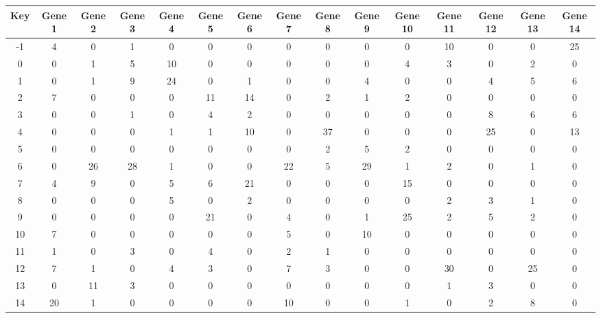 \begin{tabular}{|c|c|c|c|c|c|c|c|c|c|c|c|c|c|c|}
\hline
Key & Gene 1 & Gene 2 & Gene 3 & Gene 4 & Gene 5 & Gene 6 & Gene 7 & Gene 8 & Gene 9 & Gene 10 & Gene 11 & Gene 12 & Gene 13 & Gene 14 \\
\hline
-1 & 4 & 0 & 1 & 0 & 0 & 0 & 0 & 0 & 0 & 0 & 10 & 0 & 0 & 25 \\
0 & 0 & 1 & 5 & 10 & 0 & 0 & 0 & 0 & 0 & 4 & 3 & 0 & 2 & 0 \\
1 & 0 & 1 & 9 & 24 & 0 & 1 & 0 & 0 & 4 & 0 & 0 & 4 & 5 & 6 \\
2 & 7 & 0 & 0 & 0 & 11 & 14 & 0 & 2 & 1 & 2 & 0 & 0 & 0 & 0 \\
3 & 0 & 0 & 1 & 0 & 4 & 2 & 0 & 0 & 0 & 0 & 0 & 8 & 6 & 6 \\
4 & 0 & 0 & 0 & 1 & 1 & 10 & 0 & 37 & 0 & 0 & 0 & 25 & 0 & 13 \\
5 & 0 & 0 & 0 & 0 & 0 & 0 & 0 & 2 & 5 & 2 & 0 & 0 & 0 & 0 \\
6 & 0 & 26 & 28 & 1 & 0 & 0 & 22 & 5 & 29 & 1 & 2 & 0 & 1 & 0 \\
7 & 4 & 9 & 0 & 5 & 6 & 21 & 0 & 0 & 0 & 15 & 0 & 0 & 0 & 0 \\
8 & 0 & 0 & 0 & 5 & 0 & 2 & 0 & 0 & 0 & 0 & 2 & 3 & 1 & 0 \\
9 & 0 & 0 & 0 & 0 & 21 & 0 & 4 & 0 & 1 & 25 & 2 & 5 & 2 & 0 \\
10 & 7 & 0 & 0 & 0 & 0 & 0 & 5 & 0 & 10 & 0 & 0 & 0 & 0 & 0 \\
11 & 1 & 0 & 3 & 0 & 4 & 0 & 2 & 1 & 0 & 0 & 0 & 0 & 0 & 0 \\
12 & 7 & 1 & 0 & 4 & 3 & 0 & 7 & 3 & 0 & 0 & 30 & 0 & 25 & 0 \\
13 & 0 & 11 & 3 & 0 & 0 & 0 & 0 & 0 & 0 & 0 & 1 & 3 & 0 & 0 \\
14 & 20 & 1 & 0 & 0 & 0 & 0 & 10 & 0 & 0 & 1 & 0 & 2 & 8 & 0 \\
\hline
\end{tabular}